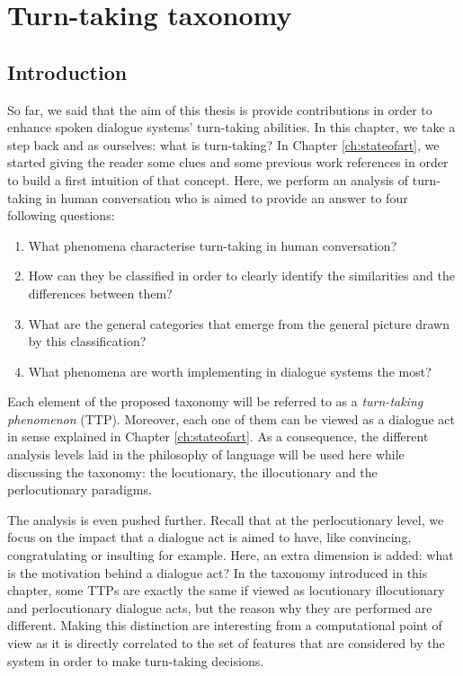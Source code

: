 \chapter{Turn-taking taxonomy}
\label{ch:taxonomy}


\section{Introduction}

        So far, we said that the aim of this thesis is provide contributions in order to enhance spoken dialogue systems' turn-taking abilities. In this chapter, we take a step back and as ourselves: what is turn-taking? In Chapter \ref{ch:stateofart}, we started giving the reader some clues and some previous work references in order to build a first intuition of that concept. Here, we perform an analysis of turn-taking in human conversation who is aimed to provide an answer to four following questions:

        \begin{enumerate}
          \item What phenomena characterise turn-taking in human conversation?
          \item How can they be classified in order to clearly identify the similarities and the differences between them?
          \item What are the general categories that emerge from the general picture drawn by this classification?
          \item What phenomena are worth implementing in dialogue systems the most?
        \end{enumerate}

        Each element of the proposed taxonomy will be referred to as a \textit{turn-taking phenomenon} (TTP). Moreover, each one of them can be viewed as a dialogue act in sense explained in Chapter \ref{ch:stateofart}. As a consequence, the different analysis levels laid in the philosophy of language will be used here while discussing the taxonomy: the locutionary, the illocutionary and the perlocutionary paradigms.

        The analysis is even pushed further. Recall that at the perlocutionary level, we focus on the impact that a dialogue act is aimed to have, like convincing, congratulating or insulting for example. Here, an extra dimension is added: what is the motivation behind a dialogue act? In the taxonomy introduced in this chapter, some TTPs are exactly the same if viewed as locutionary illocutionary and perlocutionary dialogue acts, but the reason why they are performed are different. Making this distinction are interesting from a computational point of view as it is directly correlated to the set of features that are considered by the system in order to make turn-taking decisions.

